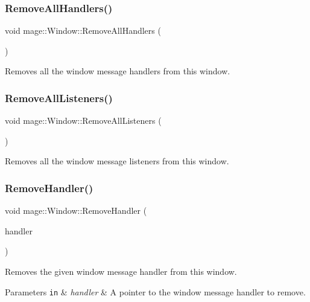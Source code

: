 \subsubsection{\texorpdfstring{Remove\+All\+Handlers()}{RemoveAllHandlers()}}
{\footnotesize\ttfamily void mage\+::\+Window\+::\+Remove\+All\+Handlers (\begin{DoxyParamCaption}{ }\end{DoxyParamCaption})\hspace{0.3cm}{\ttfamily [noexcept]}}

Removes all the window message handlers from this window. \mbox{\label{classmage_1_1_window_a1bb37381e94c541027d1ee4da7f6c7e2}} 
\subsubsection{\texorpdfstring{Remove\+All\+Listeners()}{RemoveAllListeners()}}
{\footnotesize\ttfamily void mage\+::\+Window\+::\+Remove\+All\+Listeners (\begin{DoxyParamCaption}{ }\end{DoxyParamCaption})\hspace{0.3cm}{\ttfamily [noexcept]}}

Removes all the window message listeners from this window. \mbox{\label{classmage_1_1_window_a81b23a696f73636ec9aa985ceda391b4}} 
\subsubsection{\texorpdfstring{Remove\+Handler()}{RemoveHandler()}}
{\footnotesize\ttfamily void mage\+::\+Window\+::\+Remove\+Handler (\begin{DoxyParamCaption}\item[{\mbox{\hyperlink{classmage_1_1_window_add1d792fb9f71e70d4fb07409d80cfdd}{Window\+Message\+Handler\+Ptr}}}]{handler }\end{DoxyParamCaption})}

Removes the given window message handler from this window.


\begin{DoxyParams}[1]{Parameters}
\mbox{\tt in}  & {\em handler} & A pointer to the window message handler to remove. \\
\hline
\end{DoxyParams}
\mbox{\label{classmage_1_1_window_a0f30903e406cf3cde3682befafcd3eba}} 
